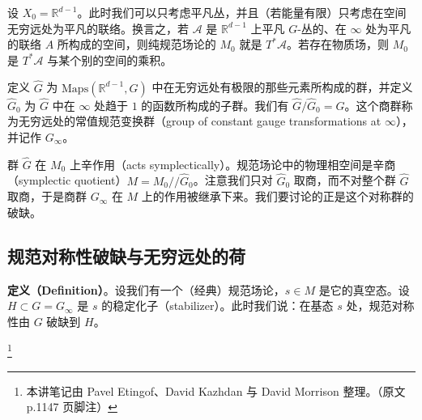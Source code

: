 
设 $X_0=\mathbb{R}^{d-1}$。此时我们可以只考虑平凡丛，并且（若能量有限）只考虑在空间无穷远处为平凡的联络。换言之，若 $\mathcal{A}$ 是 $\mathbb{R}^{d-1}$ 上平凡 $G$-丛的、在 $\infty$ 处为平凡的联络 $A$ 所构成的空间，则纯规范场论的 $M_0$ 就是 $T^*\mathcal{A}$。若存在物质场，则 $M_0$ 是 $T^*\mathcal{A}$ 与某个别的空间的乘积。

定义 $\widehat{G}$ 为 $\mathrm{Maps}(\mathbb{R}^{d-1},G)$ 中在无穷远处有极限的那些元素所构成的群，并定义 $\widehat{G}_0$ 为 $\widehat{G}$ 中在 $\infty$ 处趋于 $1$ 的函数所构成的子群。我们有 $\widehat{G}/\widehat{G}_0=G$。这个商群称为无穷远处的常值规范变换群（group of constant gauge transformations at $\infty$），并记作 $G_\infty$。


群 $\widehat{G}$ 在 $M_0$ 上辛作用（acts symplectically）。规范场论中的物理相空间是辛商（symplectic quotient）$M=M_0/\!/\widehat{G}_0$。注意我们只对 $\widehat{G}_0$ 取商，而不对整个群 $\widehat{G}$ 取商，于是商群 $G_\infty$ 在 $M$ 上的作用被继承下来。我们要讨论的正是这个对称群的破缺。

\subsection{规范对称性破缺与无穷远处的荷}

\textbf{定义（Definition）}。设我们有一个（经典）规范场论，$s\in M$ 是它的真空态。设 $H\subset G=G_\infty$ 是 $s$ 的稳定化子（stabilizer）。此时我们说：在基态 $s$ 处，规范对称性由 $G$ 破缺到 $H$。

\footnote{本讲笔记由 Pavel Etingof、David Kazhdan 与 David Morrison 整理。（原文 p.1147 页脚注）}

